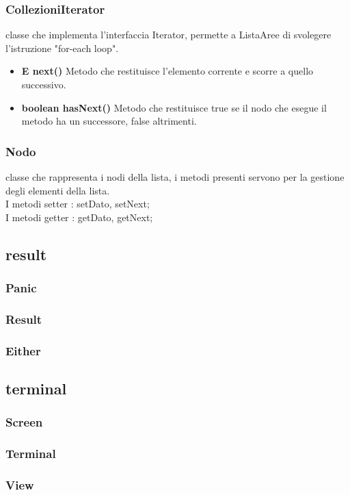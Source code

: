 \documentclass[a4paper, 12pt]{report}
\begin{document}
				\subsubsection{CollezioniIterator} classe che implementa l'interfaccia Iterator, permette a ListaAree di svolegere l'istruzione "for-each loop".
				\begin{itemize}
					\item\textbf{E next()} Metodo che restituisce l'elemento corrente e scorre a quello successivo.
					\item\textbf{boolean hasNext()} Metodo che restituisce true se il nodo che esegue il metodo ha un successore, false altrimenti.
				\end{itemize}


				\subsubsection{Nodo}
				classe che rappresenta i nodi della lista, i metodi presenti servono per la gestione degli elementi della lista.\\
				I metodi setter : setDato, setNext;\\
				I metodi getter : getDato, getNext;
			\subsection{result}
				\subsubsection{Panic}
				\subsubsection{Result}
				\subsubsection{Either}

			\subsection{terminal}
				\subsubsection{Screen}
				\subsubsection{Terminal}
				\subsubsection{View}
\end{document}
